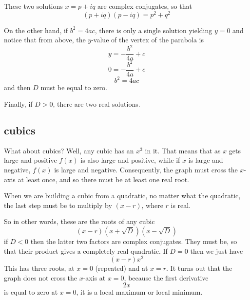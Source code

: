 \documentclass[11pt, oneside]{article}   	%
\begin{document}
These two solutions $x = p \pm i q$ are complex conjugates, so that
\[ (p + iq)(p - iq) = p^2 + q^2 \]

On the other hand, if $b^2 = 4ac$, there is only a single solution yielding $y=0$ and notice that from above, the $y$-value of the vertex of the parabola is 
\[ y = - \frac{b^2}{4a} + c \]
\[ 0 = - \frac{b^2}{4a} + c \]
\[ b^2 = 4ac \]
and then $D$ must be equal to zero.

Finally, if $D>0$, there are two real solutions.
\subsection*{cubics}
What about cubics?  Well, any cubic has an $x^3$ in it.  That means that as $x$ gets large and positive $f(x)$ is also large and positive, while if $x$ is large and negative, $f(x)$ is large and negative.  Consequently, the graph must cross the $x$-axis at least once, and so there must be at least one real root.  

When we are building a cubic from a quadratic, no matter what the quadratic, the last step must be to multiply by $(x-r)$, where $r$ is real.

So in other words, these are the roots of any cubic
\[ (x-r)(x + \sqrt{D})(x - \sqrt{D}) \]
if $D<0$ then the latter two factors are complex conjugates.  They must be, so that their product gives a completely real quadratic.  If $D=0$ then we just have
\[ (x-r)x^2 \]
This has three roots, at $x=0$ (repeated) and at $x=r$.  It turns out that the graph does not cross the $x$-axis at $x=0$, because the first derivative
\[ 2x \]
is equal to zero at $x=0$, it is a local maximum or local minimum.
\end{document}
